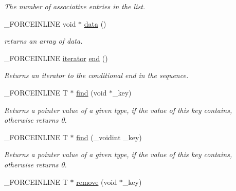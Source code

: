 \begin{DoxyCompactItemize}
\begin{DoxyCompactList}\small\item\em The number of associative entries in the list. \end{DoxyCompactList}\item 
\hypertarget{classbt_1_1_map_void_a267ed1ed3d4095601953f060ba0a04bb}{\-\_\-\-F\-O\-R\-C\-E\-I\-N\-L\-I\-N\-E void $\ast$ \hyperlink{classbt_1_1_map_void_a267ed1ed3d4095601953f060ba0a04bb}{data} ()}\label{classbt_1_1_map_void_a267ed1ed3d4095601953f060ba0a04bb}

\begin{DoxyCompactList}\small\item\em returns an array of data. \end{DoxyCompactList}\item 
\hypertarget{classbt_1_1_map_void_afab80571070ca487a69e6ee1093c1512}{\-\_\-\-F\-O\-R\-C\-E\-I\-N\-L\-I\-N\-E \hyperlink{classbt_1_1_map_void_1_1iterator}{iterator} \hyperlink{classbt_1_1_map_void_afab80571070ca487a69e6ee1093c1512}{end} ()}\label{classbt_1_1_map_void_afab80571070ca487a69e6ee1093c1512}

\begin{DoxyCompactList}\small\item\em Returns an iterator to the conditional end in the sequence. \end{DoxyCompactList}\item 
\hypertarget{classbt_1_1_map_void_a25ea0d26d5da4c620585e849b8c79a1b}{\-\_\-\-F\-O\-R\-C\-E\-I\-N\-L\-I\-N\-E T $\ast$ \hyperlink{classbt_1_1_map_void_a25ea0d26d5da4c620585e849b8c79a1b}{find} (void $\ast$\-\_\-key)}\label{classbt_1_1_map_void_a25ea0d26d5da4c620585e849b8c79a1b}

\begin{DoxyCompactList}\small\item\em Returns a pointer value of a given type, if the value of this key contains, otherwise returns 0. \end{DoxyCompactList}\item 
\hypertarget{classbt_1_1_map_void_ac51ef9237600c576a7f26ca7c45227cf}{\-\_\-\-F\-O\-R\-C\-E\-I\-N\-L\-I\-N\-E T $\ast$ \hyperlink{classbt_1_1_map_void_ac51ef9237600c576a7f26ca7c45227cf}{find} (\-\_\-voidint \-\_\-key)}\label{classbt_1_1_map_void_ac51ef9237600c576a7f26ca7c45227cf}

\begin{DoxyCompactList}\small\item\em Returns a pointer value of a given type, if the value of this key contains, otherwise returns 0. \end{DoxyCompactList}\item 
\hypertarget{classbt_1_1_map_void_a5d8e5be48d36569e828471d12c16573c}{\-\_\-\-F\-O\-R\-C\-E\-I\-N\-L\-I\-N\-E T $\ast$ \hyperlink{classbt_1_1_map_void_a5d8e5be48d36569e828471d12c16573c}{remove} (void $\ast$\-\_\-key)}\label{classbt_1_1_map_void_a5d8e5be48d36569e828471d12c16573c}


\end{DoxyCompactItemize}
